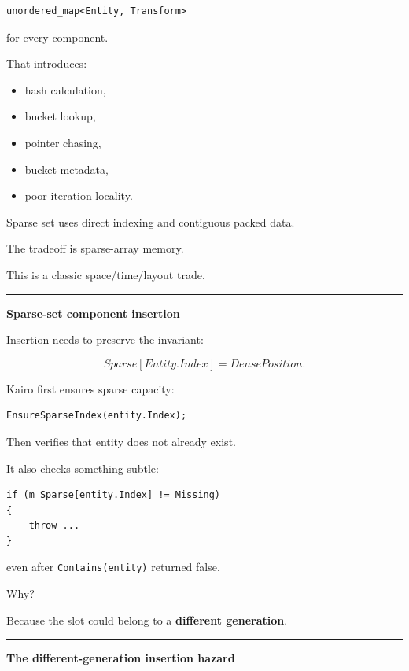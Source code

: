 \begin{verbatim}
unordered_map<Entity, Transform>
\end{verbatim}

for every component.

That introduces:

\begin{itemize}
\tightlist
\item
  hash calculation,
\item
  bucket lookup,
\item
  pointer chasing,
\item
  bucket metadata,
\item
  poor iteration locality.
\end{itemize}

Sparse set uses direct indexing and contiguous packed data.

The tradeoff is sparse-array memory.

This is a classic space/time/layout trade.

\begin{center}\rule{0.5\linewidth}{0.5pt}\end{center}

\textbf{Sparse-set component insertion}

Insertion needs to preserve the invariant:

\[
Sparse[Entity.Index]=DensePosition.
\]

Kairo first ensures sparse capacity:

\begin{verbatim}
EnsureSparseIndex(entity.Index);
\end{verbatim}

Then verifies that entity does not already exist.

It also checks something subtle:

\begin{verbatim}
if (m_Sparse[entity.Index] != Missing)
{
    throw ...
}
\end{verbatim}

even after \texttt{Contains(entity)} returned false.

Why?

Because the slot could belong to a \textbf{different generation}.

\begin{center}\rule{0.5\linewidth}{0.5pt}\end{center}

\textbf{The different-generation insertion hazard}

